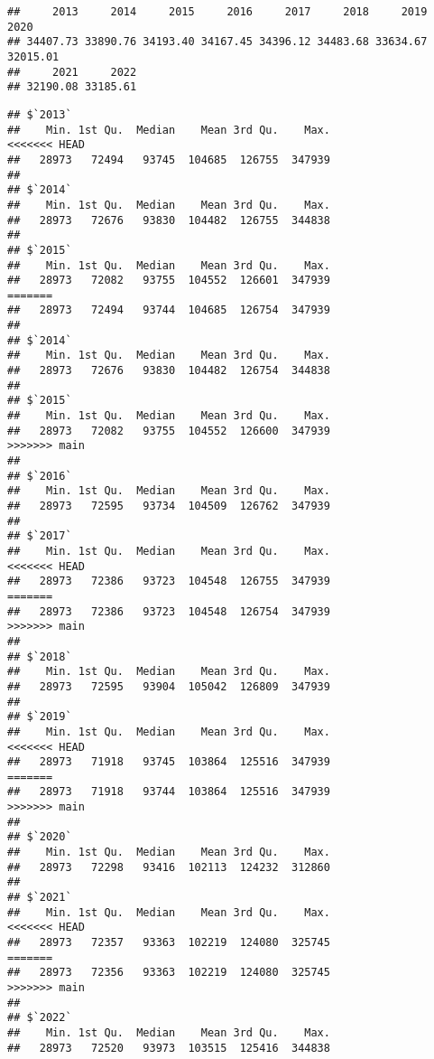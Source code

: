 \documentclass[
]{article}
\newenvironment{Shaded}{\begin{snugshade}}{\end{snugshade}}
\newcommand{\AttributeTok}[1]{\textcolor[rgb]{0.13,0.29,0.53}{#1}}
\newcommand{\ConstantTok}[1]{\textcolor[rgb]{0.56,0.35,0.01}{#1}}
\newcommand{\FunctionTok}[1]{\textcolor[rgb]{0.13,0.29,0.53}{\textbf{#1}}}
\newcommand{\NormalTok}[1]{#1}
\newcommand{\SpecialCharTok}[1]{\textcolor[rgb]{0.81,0.36,0.00}{\textbf{#1}}}
\begin{document}
\begin{Shaded}
\end{Shaded}

\begin{verbatim}
##     2013     2014     2015     2016     2017     2018     2019     2020 
## 34407.73 33890.76 34193.40 34167.45 34396.12 34483.68 33634.67 32015.01 
##     2021     2022 
## 32190.08 33185.61
\end{verbatim}

\begin{Shaded}
\end{Shaded}

\begin{verbatim}
## $`2013`
##    Min. 1st Qu.  Median    Mean 3rd Qu.    Max. 
<<<<<<< HEAD
##   28973   72494   93745  104685  126755  347939 
## 
## $`2014`
##    Min. 1st Qu.  Median    Mean 3rd Qu.    Max. 
##   28973   72676   93830  104482  126755  344838 
## 
## $`2015`
##    Min. 1st Qu.  Median    Mean 3rd Qu.    Max. 
##   28973   72082   93755  104552  126601  347939 
=======
##   28973   72494   93744  104685  126754  347939 
## 
## $`2014`
##    Min. 1st Qu.  Median    Mean 3rd Qu.    Max. 
##   28973   72676   93830  104482  126754  344838 
## 
## $`2015`
##    Min. 1st Qu.  Median    Mean 3rd Qu.    Max. 
##   28973   72082   93755  104552  126600  347939 
>>>>>>> main
## 
## $`2016`
##    Min. 1st Qu.  Median    Mean 3rd Qu.    Max. 
##   28973   72595   93734  104509  126762  347939 
## 
## $`2017`
##    Min. 1st Qu.  Median    Mean 3rd Qu.    Max. 
<<<<<<< HEAD
##   28973   72386   93723  104548  126755  347939 
=======
##   28973   72386   93723  104548  126754  347939 
>>>>>>> main
## 
## $`2018`
##    Min. 1st Qu.  Median    Mean 3rd Qu.    Max. 
##   28973   72595   93904  105042  126809  347939 
## 
## $`2019`
##    Min. 1st Qu.  Median    Mean 3rd Qu.    Max. 
<<<<<<< HEAD
##   28973   71918   93745  103864  125516  347939 
=======
##   28973   71918   93744  103864  125516  347939 
>>>>>>> main
## 
## $`2020`
##    Min. 1st Qu.  Median    Mean 3rd Qu.    Max. 
##   28973   72298   93416  102113  124232  312860 
## 
## $`2021`
##    Min. 1st Qu.  Median    Mean 3rd Qu.    Max. 
<<<<<<< HEAD
##   28973   72357   93363  102219  124080  325745 
=======
##   28973   72356   93363  102219  124080  325745 
>>>>>>> main
## 
## $`2022`
##    Min. 1st Qu.  Median    Mean 3rd Qu.    Max. 
##   28973   72520   93973  103515  125416  344838
\end{verbatim}
\end{document}
